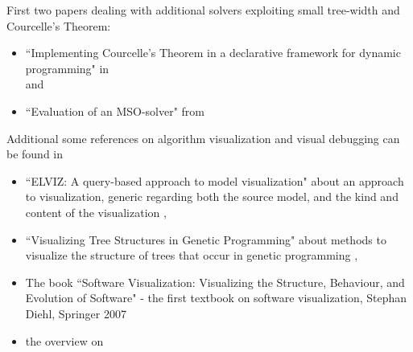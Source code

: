 \documentclass[a4paper, 12pt, bibliography=totoc]{scrartcl}
\begin{document}
First two papers dealing with additional solvers exploiting small tree-width and Courcelle's Theorem:
\begin{itemize}
	\item ``Implementing Courcelle's Theorem in a declarative framework for dynamic programming" in \cite{ImplCourcelleDP16} \\
	and
	\item ``Evaluation of an MSO-solver" from \cite{evaluationMSO}
\end{itemize}
%


Additional some references on algorithm visualization and visual debugging can be found in
\begin{itemize}
	\item ``ELVIZ: A query-based approach to model visualization" about an approach to visualization, generic regarding both the source model, and the kind and content of the visualization \cite{ELVIZ},
	
	\item ``Visualizing Tree Structures in Genetic Programming" about methods to visualize the structure of trees that occur in genetic programming \cite{VisuTDinGP},
	
	\item The book ``Software Visualization: Visualizing the Structure, Behaviour, and Evolution of Software" - the first textbook on software visualization, Stephan Diehl, Springer 2007 \cite{SoftwareVisualization}
	
	\item the overview on 
\end{itemize}
\end{document}
